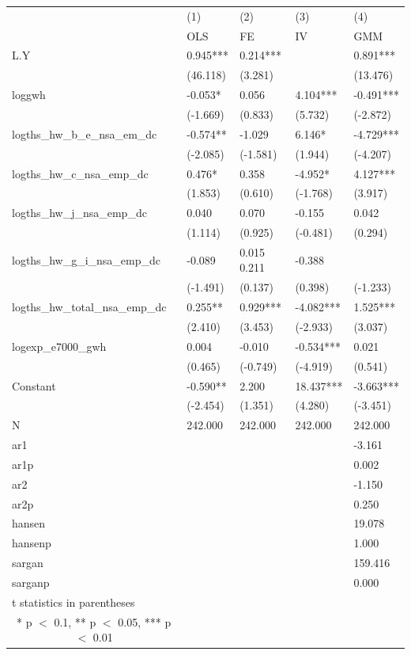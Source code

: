 \documentclass[12pt]{article}
\begin{document}
\begin{tabular}{ p{5.2cm} p{2cm} p{2cm} p{2cm} p{2cm} }

  \hline
   &(1)&(2)&(3)&(4)\\
   &OLS&FE&IV&GMM\\
 \hline
 L.Y&0.945***&0.214***& &0.891***\\
  &(46.118)&(3.281)& &(13.476)\\
 loggwh&-0.053*&0.056&4.104***&-0.491***\\
  &(-1.669)&(0.833)&(5.732)&(-2.872)\\
logths\_hw\_b\_e\_nsa\_em\_dc&-0.574**&-1.029&6.146*&-4.729***\\
  &(-2.085)&(-1.581)&(1.944)&(-4.207)\\
 logths\_hw\_c\_nsa\_emp\_dc&0.476*&0.358	&-4.952*&4.127***\\
  &(1.853)&(0.610)&(-1.768)&(3.917)\\
logths\_hw\_j\_nsa\_emp\_dc&0.040&0.070&-0.155&0.042\\
  &(1.114)&(0.925)&(-0.481)&(0.294)\\
 logths\_hw\_g\_i\_nsa\_emp\_dc&-0.089&0.015	0.211&-0.388\\
  &(-1.491)&(0.137)&(0.398)&(-1.233)\\
logths\_hw\_total\_nsa\_emp\_dc&0.255**&0.929***&-4.082***&1.525***\\
  &(2.410)&(3.453)&(-2.933)&(3.037)\\
logexp\_e7000\_gwh&0.004&-0.010&-0.534***&0.021\\
  &(0.465)&(-0.749)&(-4.919)&(0.541)\\
 Constant&-0.590**&2.200&18.437***&-3.663***\\
  &(-2.454)&(1.351)&(4.280)&(-3.451)\\
 \hline
 N&242.000&242.000&242.000&242.000\\
 ar1& & & &-3.161\\
 ar1p& & & &0.002\\
 ar2& & & &-1.150\\
 ar2p& & & &0.250\\
hansen&	& &	&19.078\\
hansenp& & & &1.000\\
sargan&	& & &159.416\\
sarganp& & & &0.000\\
 \hline
 t statistics in parentheses\\
\multicolumn{1}{c}{* p $<$ 0.1, ** p $<$ 0.05, *** p $<$ 0.01} \\
\end{tabular}
\end{document}
